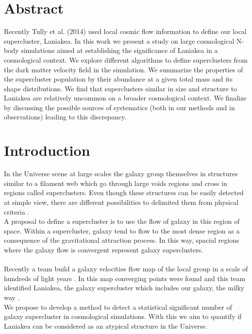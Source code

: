 \documentclass[12pt]{article}
\begin{document}
\section{Abstract}
Recently Tully et al. (2014)
 \cite{tully_laniakea_2014} used local cosmic flow
 information to define our local supercluster,
  Laniakea. 
In this work we present a study on large
 cosmological N-body
simulations aimed at establishing the significance
 of Laniakea in a
cosmological context.
We explore different algorithms to define
 superclusters from the dark
matter velocity field in the simulation. 
We summarize the properties of the supercluster
 population by their
abundance at a given total mass and its shape
 distributions.
We find that superclusters similar in size and
 structure to Laniakea are
relatively uncommon on a broader cosmological
 context.
We finalize by discussing the possible sources of
 systematics (both in
our methods and in observations) leading to this
 discrepancy.
\newpage
\tableofcontents
\newpage

\section{Introduction}

In the Universe scene at large scales the galaxy group themselves in structures
similar to a filament web which go through large voids regions and cross in regions
called superclusters. Even though these structures can be easily detected at simple
view, there are different possibilities to delimited them from physical criteria \cite{gott_iii_map_2005}.    
\\

A proposal to define a supercluster is to use the flow of galaxy in this region of
space. Within a supercluster, galaxy tend to flow to the most dense region as a
consequence of the gravitational attraction process. In this way, spacial regions where
the galaxy flow is convergent represent galaxy superclusters.\\
\\
Recently a team build a galaxy velocities flow map of the local group in a scale of
hundreds of light years \cite{tully_cosmicflows-2_2013}. In this map converging points
were found and this team identified Laniakea, the galaxy supercluster which includes
our galaxy, the milky way \cite{tully_laniakea_2014}.
\\   

We propose to develop a method to detect a
 statistical significant number of galaxy
supercluster in cosmological simulations. 
With this we aim to quantify if Laniakea can be
 considered as an atypical structure in
the Universe. 
\\
\end{document}
